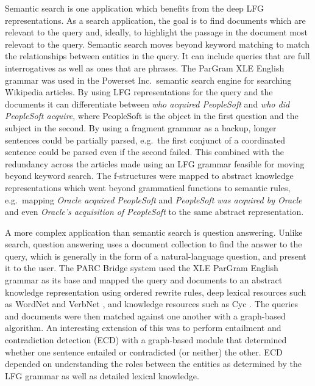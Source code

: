 \documentclass[output=paper,hidelinks]{langscibook}
\begin{document}
Semantic search is one application which benefits from the deep LFG representations. As a search application, the goal is to find documents which are relevant to the query and, ideally, to highlight the passage in the document most relevant to the query. Semantic search moves beyond keyword matching to match the relationships between entities in the query. It can include queries that are full interrogatives as well as ones that are  phrases. The ParGram XLE English grammar was used in the Powerset Inc.\ semantic search engine for searching Wikipedia articles. By using LFG representations for the query and the documents it can differentiate between {\em who acquired PeopleSoft} and {\em who did PeopleSoft acquire}, where PeopleSoft is the object in the first  question and the subject in the second. By using a fragment grammar as a backup, longer sentences could be partially parsed, e.g.\ the first conjunct of a coordinated sentence could be parsed even if the second failed. This combined with the redundancy across the articles made using an LFG grammar feasible for moving beyond keyword search. The f-structures were mapped to abstract knowledge representations which went beyond grammatical functions to semantic rules, e.g.\ mapping {\em Oracle acquired PeopleSoft} and {\em PeopleSoft was acquired by Oracle} and even {\em Oracle's acquisition of PeopleSoft} to the same abstract representation.

A more complex application than semantic search is question answering. Unlike search, question answering uses a document collection to find the answer to the query, which is generally in the form of a natural-language question, and present it to the user. The PARC Bridge system \citep{bobrowetal07} used the XLE ParGram English grammar as its base and mapped the query and documents to an abstract knowledge representation using ordered rewrite rules, deep lexical resources such as WordNet \citep{wordnet} and VerbNet \citep{kipperetal2000,levin93}, and  knowledge resources such as Cyc \citep{lenat95}. The queries and documents were then matched against one another with a graph-based algorithm. An interesting extension of this was to perform entailment and contradiction detection (ECD)  \citep{bobrowetal07} with a graph-based module that determined whether one sentence entailed or contradicted (or neither) the other. ECD depended on understanding the roles between the entities as determined by the LFG grammar as well as detailed lexical knowledge.
\end{document}
